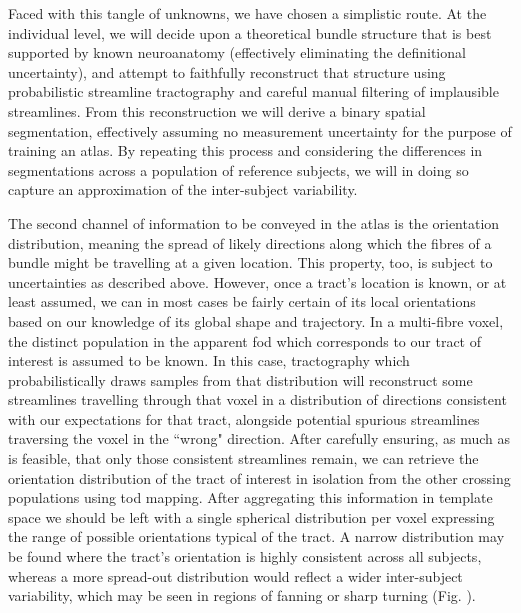 Faced with this tangle of unknowns, we have chosen a simplistic route.
At the individual level, we will decide upon a theoretical bundle structure that is best supported by known neuroanatomy (effectively eliminating the definitional uncertainty), and attempt to faithfully reconstruct that structure using probabilistic streamline tractography and careful manual filtering of implausible streamlines.
From this reconstruction we will derive a binary spatial segmentation, effectively assuming no measurement uncertainty for the purpose of training an atlas. %
By repeating this process and considering the differences in segmentations across a population of reference subjects, we will in doing so capture an approximation of the inter-subject variability.

The second channel of information to be conveyed in the atlas is the orientation distribution, meaning the spread of likely directions along which the fibres of a bundle might be travelling at a given location.
This property, too, is subject to uncertainties as described above.
However, once a tract's location is known, or at least assumed, we can in most cases be fairly certain of its local orientations based on our knowledge of its global shape and trajectory.
In a multi-fibre voxel, the distinct population in the apparent \gls{fod} which corresponds to our tract of interest is assumed to be known.
In this case, tractography which probabilistically draws samples from that distribution will reconstruct some streamlines travelling through that voxel in a distribution of directions consistent with our expectations for that tract, alongside potential spurious streamlines traversing the voxel in the ``wrong" direction.
After carefully ensuring, as much as is feasible, that only those consistent streamlines remain, we can retrieve the orientation distribution of the tract of interest in isolation from the other crossing populations using \gls{tod} mapping.
After aggregating this information in template space we should be left with a single spherical distribution per voxel expressing the range of possible orientations typical of the tract.
A narrow distribution may be found where the tract's orientation is highly consistent across all subjects, whereas a more spread-out distribution would reflect a wider inter-subject variability, which may be seen in regions of fanning or sharp turning (Fig. ).

